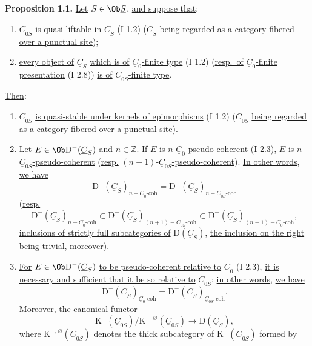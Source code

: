 \textbf{Proposition 1.1.} \uline{Let} $S\in\Ob \underline{S}$, \uline{and suppose that}:
\begin{enumerate}[label=(\roman*)]
\item $\underline{C}_{0S}$ \uline{is quasi-liftable in} $\underline{C}_S$ (I 1.2) ($\underline{C}_S$ \uline{being regarded as a category fibered over a punctual site});
\item \uline{every object of} $\underline{C}_S$ \uline{which is of} $\underline{C}_0$\uline{-finite type} (I 1.2) (\uline{resp.\ of} $\underline{C}_0$\uline{-finite presentation} (I 2.8)) \uline{is of} $\underline{C}_{0S}$\uline{-finite type}.
\end{enumerate}
\uline{Then}:
\begin{enumerate}[label=\alph*)]
\item $\underline{C}_{0S}$ \uline{is quasi-stable under kernels of epimorphisms} (I 1.2) ($\underline{C}_{0S}$ \uline{being regarded as a category fibered over a punctual site}).
\item \uline{Let} $E\in\Ob \mathrm D^{-}(\underline{C}_S)$ \uline{and} $n\in\mathbb Z$. \uline{If} $E$ \uline{is} $n$-$\underline{C}_0$\uline{-pseudo-coherent} (I 2.3), $E$ \uline{is} $n$-$\underline{C}_{0S}$\uline{-pseudo-coherent} (\uline{resp.} $(n+1)$-$\underline{C}_{0S}$\uline{-pseudo-coherent}). \uline{In other words}, \uline{we have}
\[
\mathrm D^{-}(\underline{C}_S)_{n-\underline{C}_0\text{-coh}}
=
\mathrm D^{-}(\underline{C}_S)_{n-\underline{C}_{0S}\text{-coh}}
\]
(\uline{resp.}
\[
\mathrm D^{-}(\underline{C}_S)_{n-\underline{C}_0\text{-coh}}
\subset
\mathrm D^{-}(\underline{C}_S)_{(n+1)-\underline{C}_{0S}\text{-coh}}
\subset
\mathrm D^{-}(\underline{C}_S)_{(n+1)-\underline{C}_0\text{-coh}},
\]
\uline{inclusions of strictly full subcategories of} $\mathrm D(\underline{C}_S)$, \uline{the inclusion on the right being trivial, moreover}).
\item \uline{For} $E\in\Ob\mathrm D^{-}(\underline{C}_S)$ \uline{to be pseudo-coherent relative to} $\underline{C}_0$ (I 2.3), \uline{it is necessary and sufficient that it be so relative to} $\underline{C}_{0S}$; \uline{in other words}, \uline{we have}
\[
\mathrm D^{-}(\underline{C}_S)_{\underline{C}_0\text{-coh}}
=
\mathrm D^{-}(\underline{C}_S)_{\underline{C}_{0S}\text{-coh}}.
\]
\uline{Moreover}, \uline{the canonical functor}
\[
\mathrm K^{-}(\underline{C}_{0S})/\mathrm K^{-,\varnothing}(\underline{C}_{0S})
\longrightarrow \mathrm D(\underline{C}_S),
\]
\uline{where} $\mathrm K^{-,\varnothing}(\underline{C}_{0S})$ \uline{denotes the thick subcategory of} $\mathrm K^{-}(\underline{C}_{0S})$ \uline{formed by}

\end{enumerate}
